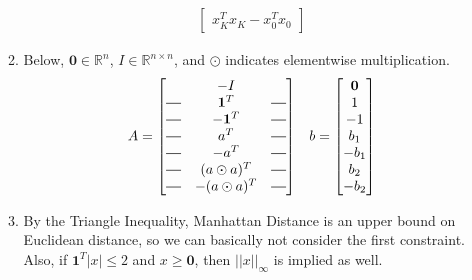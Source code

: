 \documentclass[12pt]{article}
\newcommand*{\horzbar}{\rule[.5ex]{2.5ex}{0.5pt}}
\begin{document}
\begin{enumerate}
\begin{enumerate}
\begin{align*}
\begin{bmatrix}
                                            x_K^T x_K - x_0^T x_0
                                      \end{bmatrix}
                        \end{align*}
                  \item Below, $\mathbf{0} \in \mathbb{R}^n$, $I \in \mathbb{R}^{n \times n}$,
                        and $\odot$ indicates elementwise multiplication.
                        \begin{align*}
                              A = \begin{bmatrix}
                                                 & -I             &          \\
                                        \horzbar & \mathbf{1}^T   & \horzbar \\
                                        \horzbar & -\mathbf{1}^T  & \horzbar \\
                                        \horzbar & a^T            & \horzbar \\
                                        \horzbar & -a^T           & \horzbar \\
                                        \horzbar & (a \odot a)^T  & \horzbar \\
                                        \horzbar & -(a \odot a)^T & \horzbar
                                  \end{bmatrix}
                               &  &
                              b = \begin{bmatrix}
                                        \mathbf{0} \\
                                        1          \\
                                        -1         \\
                                        b_1        \\
                                        -b_1       \\
                                        b_2        \\
                                        -b_2
                                  \end{bmatrix}
                        \end{align*}
                  \item By the Triangle Inequality, Manhattan Distance is an upper bound
                        on Euclidean distance, so we can basically not consider the first constraint.
                        Also, if $\mathbf{1}^T |x| \le 2$ and $x \ge \mathbf{0}$, then $||x||_\infty$ is implied as well.


\end{enumerate}
\end{enumerate}
\end{document}
